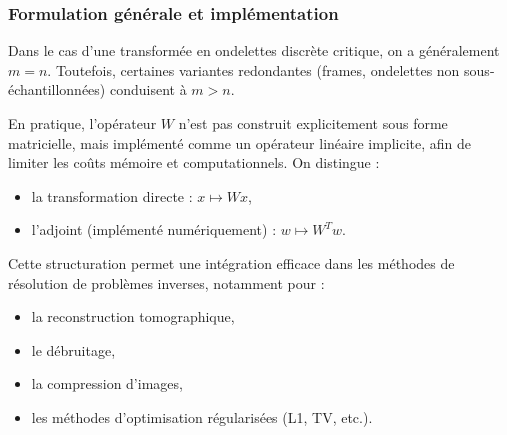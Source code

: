 \subsubsection{Formulation générale et implémentation}

Dans le cas d'une transformée en ondelettes discrète critique, on a généralement $m = n$. Toutefois, certaines variantes redondantes (frames, ondelettes non sous-échantillonnées) conduisent à $m > n$.

En pratique, l'opérateur $W$ n'est pas construit explicitement sous forme matricielle, mais implémenté comme un opérateur linéaire implicite, afin de limiter les coûts mémoire et computationnels. On distingue :

\begin{itemize}[label=-]
\item la transformation directe : $x \mapsto Wx$,
\item l'adjoint (implémenté numériquement) : $w \mapsto W^T w$.
\end{itemize}

Cette structuration permet une intégration efficace dans les méthodes de résolution de problèmes inverses, notamment pour :

\begin{itemize}[label=-]
\item la reconstruction tomographique,
\item le débruitage,
\item la compression d'images,
\item les méthodes d'optimisation régularisées (L1, TV, etc.).
\end{itemize}

